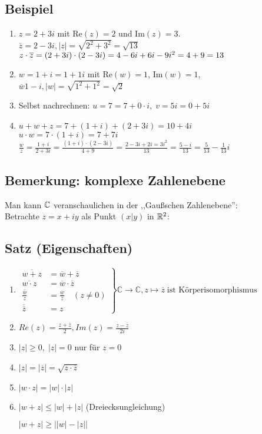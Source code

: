 \subsection{Beispiel}
\begin{enumerate}
	\item
	$z= 2+3i$ mit Re$(z)=2$ und Im$(z)=3$.\\
	$\overline{z} = 2-3i, |z|=\sqrt{2^2+3^2}= \sqrt{13}$\\
	$z \cdot \overline{z}=(2+3i)\cdot(2-3i)\\
	=4-6i+6i-9i^2
	=4+9=13$
	\item
	$w= 1+i = 1+1i$ mit Re$(w)=1$, Im$(w)=1$, $\overline{w} 1-i, |w|=\sqrt{1^2+1^2}=\sqrt{2}$
	\item
	Selbst nachrechnen: $u=7=7+0 \cdot i,\; v= 5i=0+5i$
	\item
	$u+w+z = 7+ (1+i) + (2+3i) = 10 + 4i$\\
	$u \cdot w = 7 \cdot (1+i) = 7+7i$\\ 
	$ \frac{w}{z}= \frac{1+i}{2+3i}= \frac{(1+i)\cdot(2-3i)}{4+9} = \frac{2-3i+2i=3i^2}{13}= \frac{5-i}{13}=\frac{5}{13}-\frac{1}{13}i$
\end{enumerate}

\subsection{Bemerkung: komplexe Zahlenebene}
Man kann $\mathbb{C}$ veranschaulichen in der ,,Gaußschen Zahlenebene'':\\
Betrachte $z=x+iy$ als Punkt $(x|y)$ in $\mathbb{R}^2$:

\subsection{Satz (Eigenschaften)}


\begin{enumerate}
	\item %
	$\left.
	\begin{array}{cl}
	\overline{w+z} &= \overline{w} + \overline{z}\\
	\overline{w\cdot z} &= \overline{w} \cdot \overline{z}\\
	\overline{\frac{w}{z}} &= \frac{\overline{w}}{\overline{z}} \quad (z \neq 0)\\
	\overline{\overline{z}} &= z
	\end{array}
	\right\rbrace \mathbb{C} \rightarrow \mathbb{C}, z \mapsto \overline{z}\; \text{ist Körperisomorphismus}$
	
	\item %
	$Re(z) = \frac{z+\overline{z}}{2}, Im(z)= \frac{z - \overline{z}}{2i}$
	\item %
	$|z| \geq 0,\; |z| = 0$ nur für $z = 0$
	\item
	$|z| = |\overline{z}| = \sqrt{z \cdot \overline{z}}$
	\item
	$|w \cdot z| = |w| \cdot |z|$
	\item
	$|w + z| \leq |w|+|z|$ (Dreiecksungleichung)
	
	$|w + z| \geq \bigg | |w|-|z| \bigg |$
\end{enumerate}


